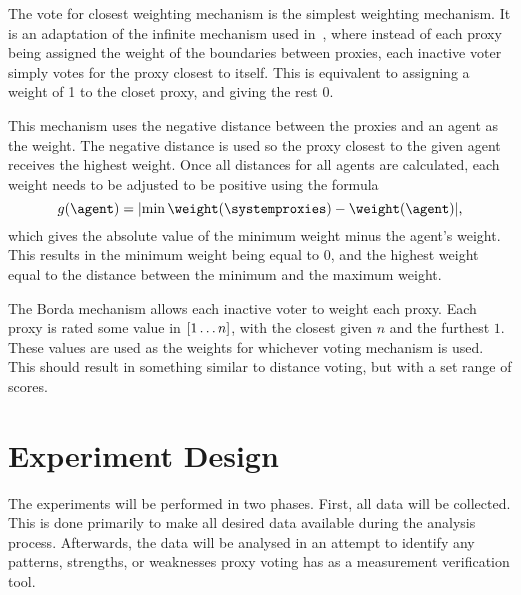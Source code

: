 The vote for closest weighting mechanism is the simplest weighting mechanism.
It is an adaptation of the infinite mechanism used in~\cite{Cohensius2017},
where instead of each proxy being assigned the weight of the boundaries
between proxies, each inactive voter simply votes for the proxy closest to
itself.
This is equivalent to assigning a weight of 1 to the closet proxy, and giving
the rest 0.

This mechanism uses the negative distance between the proxies and an agent as
the weight.
The negative distance is used so the proxy closest to the given agent
receives the highest weight.
Once all distances for all agents are calculated, each weight needs to be
adjusted to be positive using the formula
\begin{equation}
    g{(\agent)} = \lvert
    \min{\weightof{\systemproxies}} - \weightof{\agent}
    \rvert
    \text{,}\label{eq:distance-voting-adjustment}
\end{equation}
which gives the absolute value of the minimum weight minus the agent's weight.
This results in the minimum weight being equal to 0, and the highest weight
equal to the distance between the minimum and the maximum weight.

\label{para:borda}
The Borda mechanism allows each inactive voter to weight each proxy.
Each proxy is rated some value in $[1 \mathellipsis n]$, with the closest
given $n$ and the furthest $1$.
These values are used as the weights for whichever voting mechanism is used.
This should result in something similar to distance voting, but with a set
range of scores.


\section{Experiment Design}\label{sec:experiment-design}
%
%

The experiments will be performed in two phases.
First, all data will be collected.
This is done primarily to make all desired data available during the analysis
process.
Afterwards, the data will be analysed in an attempt to identify any patterns,
strengths, or weaknesses proxy voting has as a measurement verification tool.

